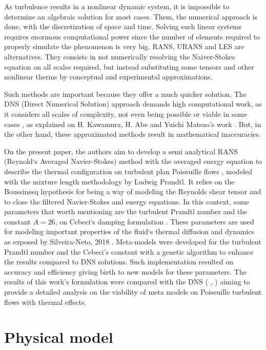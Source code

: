 \documentclass[10pt]{article} %
\begin{document}
As turbulence results in a nonlinear dynamic system, it is impossible to determine an algebraic solution for most cases. Them, the numerical approach is done, with the discretization of space and time. Solving such linear systems requires enormous computational power since the number of elements required to properly simulate the phenomenon is very big. RANS, URANS and LES are alternatives. They consists in not numerically resolving the Naiver-Stokes equation on all scales required, but instead substituting some tensors and other nonlinear therms by conceptual and experimental approximations.

Such methods are important because they offer a much quicker solution. The DNS (Direct Numerical Solution) approach demands high computational work, as it considers all scales of complexity, not even being possible or viable in some cases \cite{Kawamura}, as explained on H. Kawamura, H. Abe and Yuichi Matsuo's work \cite{Abe}. But, in the other hand, these approximated methods result in mathematical inaccuracies.    

On the present paper, the authors aim to develop a semi analytical RANS (Reynold`s Averaged Navier-Stokes) method with the averaged energy equation to describe the thermal configuration on turbulent plan Poiseuille flows \cite{Poiseuille}, modeled with the mixture length methodology by Ludwig Prandtl. It relies on the Boussinesq hypothesis for being a way of modeling the Reynolds shear tensor and to close the filtered Navier-Stokes and energy equations. In this context, some parameters that worth mentioning are the turbulent Prandtl number \cite{Prandtl} and the constant $A = 26$, on Cebeci`s damping formulation \cite{Cebeci}. These parameters are used for modeling important properties of the fluid`s thermal diffusion and dynamics as exposed by Silveira-Neto, 2018 \cite{aristeu}. Meta-models were developed for the turbulent Prandtl number and the Cebeci's constant with a genetic algorithm to enhance the results compared to DNS solutions. Such implementation resulted on accuracy and efficiency giving birth to new models for these parameters. The results of this work's formulation were compared with the DNS (\cite{DNS1020} , \cite{DNS150}) aiming to provide a detailed analysis on the viability of meta models on Poiseuille turbulent flows with thermal effects. \\       
 

\section{Physical model}
\end{document}
